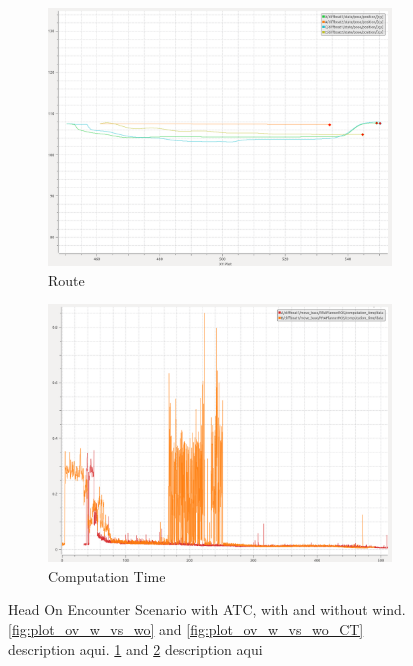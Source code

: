 \begin{figure}[H]
            \begin{subfigure}[b]{0.45\textwidth}
                \centering
                \includegraphics[width=\textwidth]{figs/Chap5/plot_ov_w_vs_wind.png}
                \caption{Route}
                \label{fig:plot_ov_w_vs_wind}
            \end{subfigure}
            \begin{subfigure}[b]{0.45\textwidth}
                \centering
                \includegraphics[width=\textwidth]{figs/Chap5/plot_ov_w_vs_wind_CT.png}
                \caption{Computation Time}
                \label{fig:plot_ov_w_vs_wind_CT}
            \end{subfigure}
        
        \caption{Head On Encounter Scenario with ATC, with and without wind. \ref{fig:plot_ov_w_vs_wo} and \ref{fig:plot_ov_w_vs_wo_CT}  description aqui. \ref{fig:plot_ov_w_vs_wind} and \ref{fig:plot_ov_w_vs_wind_CT} description aqui}
        \label{fig:plots_ov}
        \end{figure}

